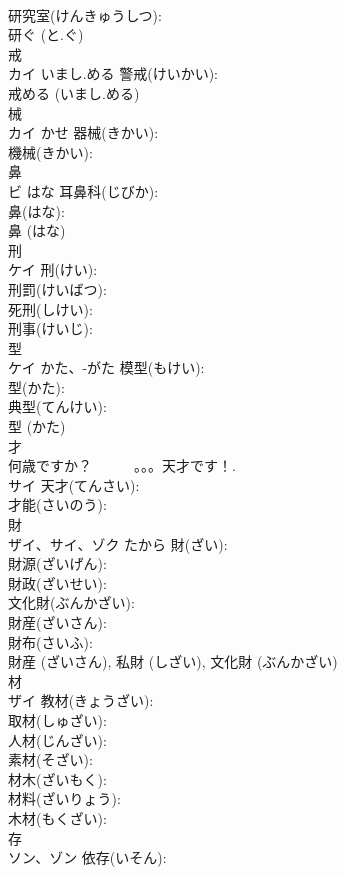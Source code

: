 \documentclass[8pt]{extreport}
\begin{document}
\begin{CJK}{UTF8}{min}
\\	研究室(けんきゅうしつ): 
\\	研ぐ (と.ぐ)
\\	戒			
\\	カイ	いまし.める	警戒(けいかい): 
\\	戒める (いまし.める)
\\	械			
\\	カイ	かせ	器械(きかい): 
\\	機械(きかい): 
\\	鼻			
\\	ビ	はな	耳鼻科(じびか): 
\\	鼻(はな): 
\\	鼻 (はな)
\\	刑			
\\	ケイ		刑(けい): 
\\	刑罰(けいばつ): 
\\	死刑(しけい): 
\\	刑事(けいじ): 
\\	型			
\\	ケイ	かた、-がた	模型(もけい): 
\\	型(かた): 
\\	典型(てんけい): 
\\	型 (かた)
\\	才			
\\	何歳ですか？　　　。。。天才です！.	
\\	サイ		天才(てんさい): 
\\	才能(さいのう): 
\\	財			
\\	ザイ、サイ、ゾク	たから	財(ざい): 
\\	財源(ざいげん): 
\\	財政(ざいせい): 
\\	文化財(ぶんかざい): 
\\	財産(ざいさん): 
\\	財布(さいふ): 
\\	財産 (ざいさん), 私財 (しざい), 文化財 (ぶんかざい)
\\	材			
\\	ザイ		教材(きょうざい): 
\\	取材(しゅざい): 
\\	人材(じんざい): 
\\	素材(そざい): 
\\	材木(ざいもく): 
\\	材料(ざいりょう): 
\\	木材(もくざい): 
\\	存			
\\	ソン、ゾン		依存(いそん): 

\end{CJK}
\end{document}
